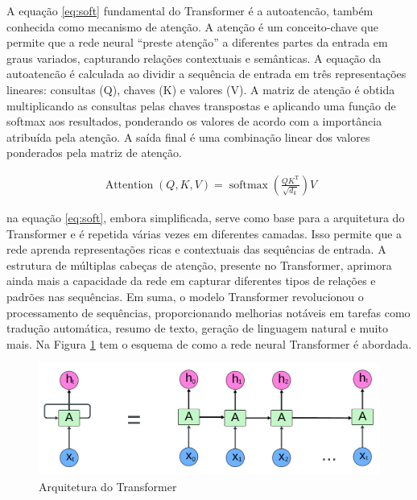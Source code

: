 A equação \eqref{eq:soft} fundamental do Transformer é a autoatencão, também conhecida como mecanismo de atenção. A atenção é um conceito-chave que permite que a rede neural ``preste atenção'' a diferentes partes da entrada em graus variados, capturando relações contextuais e semânticas. A equação da autoatencão é calculada ao dividir a sequência de entrada em três representações lineares: consultas (Q), chaves (K) e valores (V). A matriz de atenção é obtida multiplicando as consultas pelas chaves transpostas e aplicando uma função de softmax aos resultados, ponderando os valores de acordo com a importância atribuída pela atenção. A saída final é uma combinação linear dos valores ponderados pela matriz de atenção.

\begin{eqnarray}
	\operatorname{Attention}(Q, K, V)=\operatorname{softmax}\left(\frac{Q K^{\mathrm{T}}}{\sqrt{d_k}}\right) V \label{eq:soft}
\end{eqnarray}

\noindent na equação \eqref{eq:soft}, embora simplificada, serve como base para a arquitetura do Transformer e é repetida várias vezes em diferentes camadas. Isso permite que a rede aprenda representações ricas e contextuais das sequências de entrada. A estrutura de múltiplas cabeças de atenção, presente no Transformer, aprimora ainda mais a capacidade da rede em capturar diferentes tipos de relações e padrões nas sequências. Em suma, o modelo Transformer revolucionou o processamento de sequências, proporcionando melhorias notáveis em tarefas como tradução automática, resumo de texto, geração de linguagem natural e muito mais. Na Figura \ref{fig:transformer} tem o esquema de como a rede neural Transformer é abordada.

\begin{figure}[H]
	\centering
	\caption{Arquitetura do Transformer}
	\label{fig:transformer}
	\includegraphics[width=1\linewidth]{Apendices/Figuras/modelagem-24h/Transformer}
	
\end{figure}
